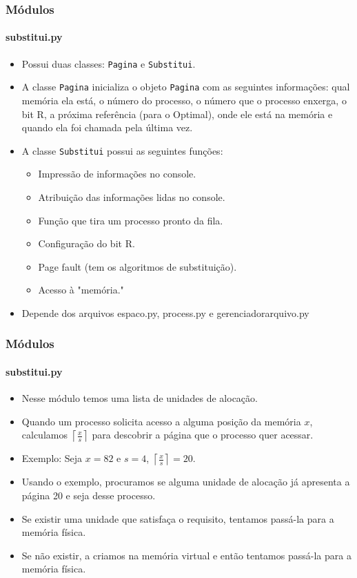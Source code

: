 \documentclass{beamer}
\begin{document}
\begin{frame}
	\frametitle{Módulos}
	\framesubtitle{substitui.py}
	\begin{itemize}
		\item Possui duas classes: \texttt{Pagina} e \texttt{Substitui}.
		\item A classe \texttt{Pagina} inicializa o objeto \texttt{Pagina} com as seguintes informações: qual memória ela está, o número do processo, o número que o processo enxerga, o bit R, a próxima referência (para o Optimal), onde ele está na memória e quando ela foi chamada pela última vez.
		\item A classe \texttt{Substitui} possui as seguintes funções:
		\begin{itemize}
			\item Impressão de informações no console.
			\item Atribuição das informações lidas no console.
			\item Função que tira um processo pronto da fila.
			\item Configuração do bit R.
			\item Page fault (tem os algoritmos de substituição).
			\item Acesso à "memória."
		\end{itemize}
		\item Depende dos arquivos espaco.py, process.py e gerenciador\textunderscore arquivo.py
	\end{itemize}
\end{frame}

\begin{frame}
	\frametitle{Módulos}
	\framesubtitle{substitui.py}
	\begin{itemize}
		\item Nesse módulo temos uma lista de unidades de alocação.
		\item Quando um processo solicita acesso a alguma posição da memória $x$, calculamos $\left \lceil{\frac{x}{s}}\right \rceil$ para descobrir a página que o processo quer acessar.
		\item Exemplo: Seja $x = 82$ e $s = 4$, $\left \lceil{\frac{x}{s}}\right \rceil = 20$. 
		\item Usando o exemplo, procuramos se alguma unidade de alocação já apresenta a página 20 e seja desse processo.
		\item Se existir uma unidade que satisfaça o requisito, tentamos passá-la para a memória física.
		\item Se não existir, a criamos na memória virtual e então tentamos passá-la para a memória física.
	\end{itemize}
\end{frame}
\end{document}
